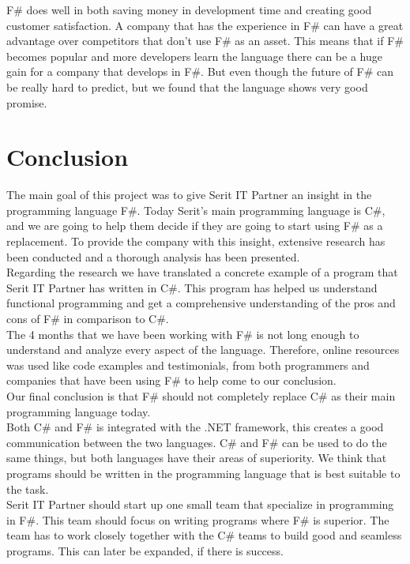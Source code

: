 \documentclass[12pt, a4paper]{article}
\begin{document}
F\# does well in both saving money in development time and creating good customer satisfaction. A company that has the experience in F\# can have a great advantage over competitors that don't use F\# as an asset. This means that if F\# becomes popular and more developers learn the language there can be a huge gain for a company that develops in F\#. But even though the future of F\# can be really hard to predict, but we found that the language shows very good promise.

\newpage

\section{Conclusion}
The main goal of this project was to give Serit IT Partner an insight in the programming language F\#. Today Serit's main programming language is C\#, and we are going to help them decide if they are going to start using F\# as a replacement. To provide the company with this insight, extensive research has been conducted and a thorough analysis has been presented.\\

Regarding the research we have translated a concrete example of a program that Serit IT Partner has written in C\#. This program has helped us understand functional programming and get a comprehensive understanding of the pros and cons of F\# in comparison to C\#.\\

The 4 months that we have been working with F\# is not long enough to understand and analyze every aspect of the language. Therefore, online resources was used like code examples and testimonials, from both programmers and companies that have been using F\# to help come to our conclusion.\\

Our final conclusion is that F\# should not completely replace C\# as their main programming language today.\\  

Both C\# and F\# is integrated with the .NET framework, this creates a good communication between the two languages. C\# and F\# can be used to do the same things, but both languages have their areas of superiority. We think that programs should be written in the programming language that is best suitable to the task.\\

Serit IT Partner should start up one small team that specialize in programming in F\#. This team should focus on writing programs where F\# is superior. The team has to work closely together with the C\# teams to build good and seamless programs. This can later be expanded, if there is success.\\
\end{document}
